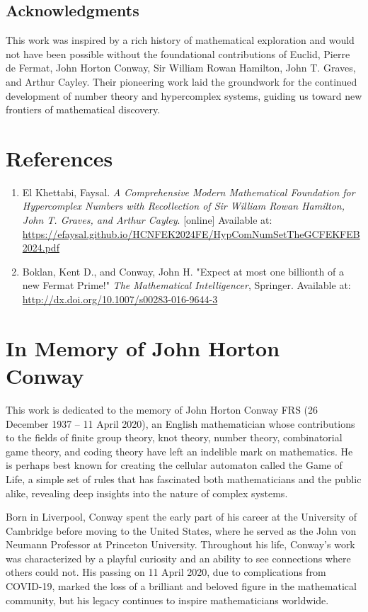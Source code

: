 \documentclass[12pt]{article}
\begin{document}
\subsection*{Acknowledgments}
This work was inspired by a rich history of mathematical exploration and would not have been possible without the foundational contributions of Euclid, Pierre de Fermat, John Horton Conway, Sir William Rowan Hamilton, John T. Graves, and Arthur Cayley. Their pioneering work laid the groundwork for the continued development of number theory and hypercomplex systems, guiding us toward new frontiers of mathematical discovery.

\section*{References}

\begin{enumerate}
    \item El Khettabi, Faysal. \textit{A Comprehensive Modern Mathematical Foundation for Hypercomplex Numbers with Recollection of Sir William Rowan Hamilton, John T. Graves, and Arthur Cayley}. [online] Available at: \url{https://efaysal.github.io/HCNFEK2024FE/HypComNumSetTheGCFEKFEB2024.pdf}
    \item Boklan, Kent D., and Conway, John H. "Expect at most one billionth of a new Fermat Prime!" \textit{The Mathematical Intelligencer}, Springer. Available at: \url{http://dx.doi.org/10.1007/s00283-016-9644-3}
\end{enumerate}

\section*{In Memory of John Horton Conway}

This work is dedicated to the memory of John Horton Conway FRS (26 December 1937 – 11 April 2020), an English mathematician whose contributions to the fields of finite group theory, knot theory, number theory, combinatorial game theory, and coding theory have left an indelible mark on mathematics. He is perhaps best known for creating the cellular automaton called the Game of Life, a simple set of rules that has fascinated both mathematicians and the public alike, revealing deep insights into the nature of complex systems.

Born in Liverpool, Conway spent the early part of his career at the University of Cambridge before moving to the United States, where he served as the John von Neumann Professor at Princeton University. Throughout his life, Conway's work was characterized by a playful curiosity and an ability to see connections where others could not. His passing on 11 April 2020, due to complications from COVID-19, marked the loss of a brilliant and beloved figure in the mathematical community, but his legacy continues to inspire mathematicians worldwide.
\end{document}
